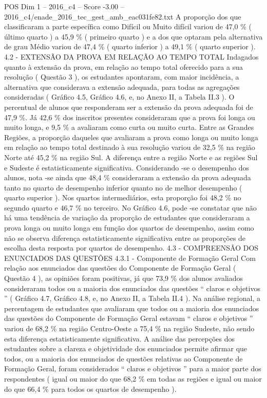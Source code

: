 \begin{textsample}{POS Dim 1 – 2016\_c4 – Score -3.00 – 2016\_c4/enade\_2016\_tec\_gest\_amb\_eac031fe82.txt}
A proporção dos que classificaram a parte específica como Difícil ou Muito difícil variou de 47,0 \% ( último quarto ) a 45,9 \% ( primeiro quarto ) e a dos que optaram pela alternativa de grau Médio variou de 47,4 \% ( quarto inferior ) a 49,1 \% ( quarto superior ). 4.2 - EXTENSÃO DA PROVA EM RELAÇÃO AO TEMPO TOTAL Indagados quanto à extensão da prova, em relação ao tempo total oferecido para a sua resolução ( Questão 3 ), os estudantes apontaram, com maior incidência, a alternativa que considerava a extensão adequada, para todas as agregações consideradas ( Gráfico 4.5, Gráfico 4.6, e, no Anexo II, a Tabela II.3 ).
O percentual de alunos que responderam ser a extensão da prova adequada foi de 47,9 \%.
Já 42,6 \% dos inscritos presentes consideraram que a prova foi longa ou muito longa, e 9,5 \% a avaliaram como curta ou muito curta.
Entre as Grandes Regiões, a proporção daqueles que avaliaram a prova como longa ou muito longa em relação ao tempo total destinado à sua resolução variou de 32,5 \% na região Norte até 45,2 \% na região Sul.
A diferença entre a região Norte e as regiões Sul e Sudeste é estatisticamente significativa.
Considerando -se o desempenho dos alunos, nota -se ainda que 48,4 \% consideraram a extensão da prova adequada tanto no quarto de desempenho inferior quanto no de melhor desempenho ( quarto superior ).
Nos quartos intermediários, esta proporção foi 48,2 \% no segundo quarto e 46,7 \% no terceiro.
No Gráfico 4.6, pode -se constatar que não há uma tendência de variação da proporção de estudantes que consideraram a prova longa ou muito longa em função dos quartos de desempenho, assim como não se observa diferença estatisticamente significativa entre as proporções de escolha desta resposta por quartos de desempenho. 4.3 - COMPREENSÃO DOS ENUNCIADOS DAS QUESTÕES 4.3.1 - Componente de Formação Geral Com relação aos enunciados das questões do Componente de Formação Geral ( Questão 4 ), as opiniões foram positivas, já que 73,9 \% dos alunos avaliados consideraram todos ou a maioria dos enunciados das questões “ claros e objetivos ” ( Gráfico 4.7, Gráfico 4.8, e, no Anexo II, a Tabela II.4 ).
Na análise regional, a percentagem de estudantes que avaliaram que todos ou a maioria dos enunciados das questões do Componente de Formação Geral estavam “ claros e objetivos ” variou de 68,2 \% na região Centro-Oeste a 75,4 \% na região Sudeste, não sendo esta diferença estatisticamente significativa.
A análise das percepções dos estudantes sobre a clareza e objetividade dos enunciados permite afirmar que todos, ou a maioria dos enunciados de questões relativas ao Componente de Formação Geral, foram considerados “ claros e objetivos ” para a maior parte dos respondentes ( igual ou maior do que 68,2 \% em todas as regiões e igual ou maior do que 66,4 \% para todos os quartos de desempenho ).

\end{textsample}
